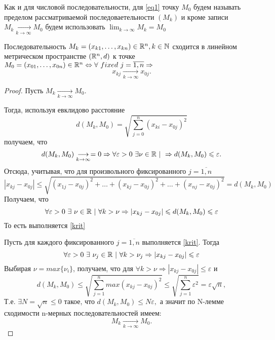 \documentclass[../../main.tex]{subfiles}
\begin{document}
	Как и для числовой последовательности, для \eqref{eq1} точку $M_0$ будем называть пределом рассматриваемой последоваетельности $(M_k)$ и кроме записи $M_k \underset{k\rightarrow\infty}{\longrightarrow}  M_0$ будем использовать $ \lim_{k \to \infty}{M_k} = M_0$
	\begin{thm}
		Последовательность $M_k = (x_{k1}, \dots, x_{kn}) \in \mathbb{R}^n, k \in \mathbb{N}$ сходится в линейном метрическом пространстве $(\mathbb{R}^n, d)$ к точке $M_0 = (x_{01}, \dots, x_{0n}) \in \mathbb{R}^n \Leftrightarrow \forall\ fixed\ j = \overline{1, n} \Rightarrow$
		\begin{equation}
		\label{krit}
			x_{kj}\underset{k\rightarrow\infty}{\longrightarrow} x_{0j}.
		\end{equation}
	\end{thm}
	\begin{proof}
		
		\nec 
		Пусть $M_k \underset{k\rightarrow\infty}{\longrightarrow}  M_0$.
		
		Тогда, используя евклидово расстояние 
		\[
			d(M_k, M_0) = \sqrt{\sum_{j = 0}^{n}{(x_{ki} - x_{0j})^2}}
		\]
		получаем, что
		\[
			d(M_k, M_0) \underset{k\rightarrow\infty}{\longrightarrow} = 0 \Rightarrow
			\forall \varepsilon > 0\ \exists \nu \in \R\ |\ \Rightarrow d(M_k, M_0) \leqslant \varepsilon.
		\]
		Отсюда, учитывая, что для произвольного фиксированного $j = \overline{1, n}$
		\[
			|x_{kj} - x_{0j}| \leqslant \sqrt{(x_{1j} - x_{0j})^2 + \dots + (x_{kj} - x_{0j})^2 + \dots + (x_{nj} - x_{0j})^2} = d(M_k, M_0) 
		\]
		Получаем, что 
		\[
			\forall \varepsilon > 0\ \exists\ \nu \in \R\ |\ \forall k > \nu \Rightarrow |x_{kj} - x_{0j}| \leqslant d(M_k, M_0) \leqslant \varepsilon
		\]
		То есть выполняется \eqref{krit}
		
		\suff Пусть для каждого фиксированного $j = \overline{1, n}$ выполняется \eqref{krit}. Тогда
		\[
			\forall \varepsilon > 0\ \exists\ \nu_j \in \mathbb{R}\ |\ \forall k > \nu_j \Rightarrow |x_{kj} - x_{0j}| \leqslant \varepsilon
		\]
		Выбирая $\nu = max\{\nu_i\}$, получаем, что для $\forall k > \nu \Rightarrow |x_{kj} - x_{0j}| \leqslant \varepsilon$
		 и 
		 \[
		 	d(M_k, M_0) \leqslant \sqrt{\sum_{j = 1}^{n}{max(x_{kj} - x_{0j})^2}} \leqslant \sqrt{\sum_{j = 1}^{n}{\varepsilon^2}} = \varepsilon\sqrt{n}, 
		 \]
		 Т.е. $\exists N = \sqrt{n} \leqslant 0$ такое, что $d(M_k, M_0) \leqslant N \varepsilon,$ а значит по N-лемме сходимости n-мерных последовательностей имеем:
		 \[
		 	M_k \underset{k\rightarrow\infty}{\longrightarrow}  M_0.
		 \]
	\end{proof}
	
	
\end{document}
